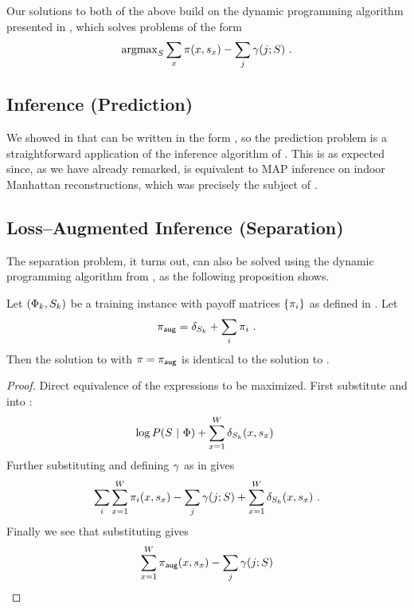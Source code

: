 Our solutions to both of the above build on the dynamic programming
algorithm presented in , which solves problems of
the form
\begin{equation}
  \argmax_{\Seam}
    \sum_x \PixelPayoff(x,\seam_x) - \sum_j \CornerPenalty(j;\Seam) ~.
  \label{eq:inference-problem}
\end{equation}

\subsection{Inference (Prediction)}

We showed in  that  can be
written in the form , so the prediction
problem is a straightforward application of the inference algorithm of
. This is as expected since, as we have already
remarked,  is equivalent to MAP inference on
indoor Manhattan reconstructions, which was precisely the subject of
.

\subsection{Loss--Augmented Inference (Separation)}

The separation problem, it turns out, can also be solved using the
dynamic programming algorithm from , as the
following proposition shows.

\begin{proposition}
  Let $(\Features_k,\Seam_k)$ be a training instance with payoff
  matrices $\{\PixelPayoff_i\}$ as defined in .
  Let
  \begin{equation}
    \AugPayoff = \LossMat_{\Seam_k} + \sum_i \PixelPayoff_i ~.
    \label{eq:aug-payoff}
  \end{equation}
  Then the solution to  with
  $\PixelPayoff=\AugPayoff$ is identical to the solution to
  .
\end{proposition}
\begin{proof}
  Direct equivalence of the expressions to be maximized. First
  substitute  and
   into :
  \begin{equation}
    \log P(\Seam ~|~ \Features) +
    \sum_{x=1}^{\Width} \LossMat_{\Seam_k}(x,\seam_x) ~
  \end{equation}
  Further substituting  and defining
  $\CornerPenalty$ as in \cite{Flint11} gives
  \begin{equation}
    \sum_i \sum_{x=1}^{\Width} \PixelPayoff_i(x,\seam_x) - 
    \sum_j \CornerPenalty(j;\Seam) +
    \sum_{x=1}^{\Width} \LossMat_{\Seam_k}(x,\seam_x) ~.
  \end{equation}
  Finally we see that substituting  gives
  \begin{equation}
    \sum_{x=1}^{\Width} \AugPayoff(x,\seam_x) - 
    \sum_j \CornerPenalty(j;\Seam)
  \end{equation}  
\end{proof}

